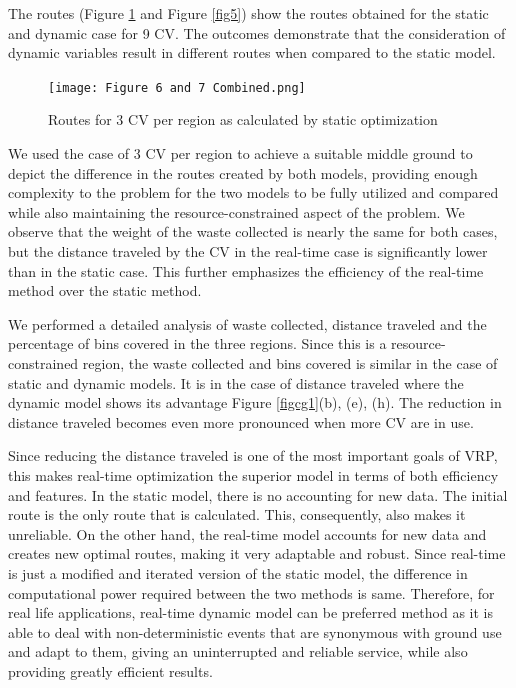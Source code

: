 \documentclass[12pt]{article}
\begin{document}
The routes (Figure \ref{fig4} and Figure \ref{fig5}) show the routes obtained for the static and dynamic case for 9 CV. The outcomes demonstrate that the consideration of dynamic variables result in different routes when compared to the static model.

\begin{figure}[H]
    \centering
    \texttt{[image: Figure 6 and 7 Combined.png]} %
    \caption{Routes for 3 CV per region as calculated by static optimization}\label{fig4}
\end{figure}


We used the case of 3 CV per region to achieve a suitable middle ground to depict the difference in the routes created by both models, providing enough complexity to the problem for the two models to be fully utilized and compared while also maintaining the resource-constrained aspect of the problem. We observe that the weight of the waste collected is nearly the same for both cases, but the distance traveled by the CV in the real-time case is significantly lower than in the static case. This further emphasizes the efficiency of the real-time method over the static method.

We performed a detailed analysis of waste collected, distance traveled and the percentage of bins covered in the three regions. Since this is a resource-constrained region, the waste collected and bins covered is similar in the case of static and dynamic models. It is in the case of distance traveled where the dynamic model shows its advantage {Figure \ref{figcg1}(b), (e), (h)}. The reduction in distance traveled becomes even more pronounced when more CV are in use.

Since reducing the distance traveled is one of the most important goals of VRP, this makes real-time optimization the superior model in terms of both efficiency and features. In the static model, there is no accounting for new data. The initial route is the only route that is calculated. This, consequently, also makes it unreliable. On the other hand, the real-time model accounts for new data and creates new optimal routes, making it very adaptable and robust. Since real-time is just a modified and iterated version of the static model, the difference in computational power required between the two methods is same. Therefore, for real life applications, real-time dynamic model can be preferred method as it is able to deal with non-deterministic events that are synonymous with ground use and adapt to them, giving an uninterrupted and reliable service, while also providing greatly efficient results.
\end{document}
